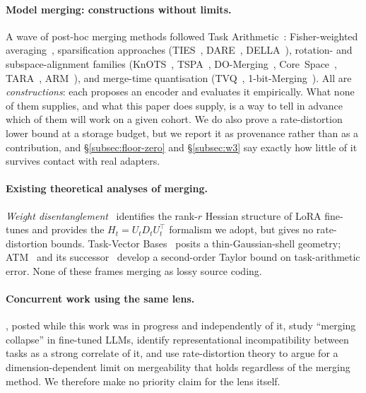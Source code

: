 \paragraph{Model merging: constructions without limits.}
A wave of post-hoc merging methods followed Task
Arithmetic~\citep{ilharco2023task}: Fisher-weighted
averaging~\citep{matena2022fisher}, sparsification approaches
(TIES~\citep{yadav2023ties}, DARE~\citep{yu2024dare},
DELLA~\citep{della2024}), rotation- and subspace-alignment families
(KnOTS~\citep{stoica2025knots}, TSPA~\citep{tspa2025},
DO-Merging~\citep{domerging2025}, Core~Space~\citep{panariello2025core},
TARA~\citep{tara2025}, ARM~\citep{arm2026streaming}), and merge-time
quantisation (TVQ~\citep{kim2025tvq},
1-bit-Merging~\citep{bit1merging2025}). All are \emph{constructions}:
each proposes an encoder and evaluates it empirically. What none of them
supplies, and what this paper does supply, is a way to tell in advance
which of them will work on a given cohort. We do also prove a
rate-distortion lower bound at a storage budget, but we report it as
provenance rather than as a contribution, and
\S\ref{subsec:floor-zero} and \S\ref{subsec:w3} say exactly how little
of it survives contact with real adapters.

\paragraph{Existing theoretical analyses of merging.}
\emph{Weight disentanglement}~\citep{ortizjimenez2023disentanglement}
identifies the rank-$r$ Hessian structure of LoRA fine-tunes and
provides the $H_t = U_t D_t U_t^\top$ formalism we adopt, but gives no
rate-distortion bounds. Task-Vector Bases~\citep{jang2025taskvectorbases}
posits a thin-Gaussian-shell geometry; ATM~\citep{atm2024alternating}
and its successor~\citep{gradients2025taskvectorsgradients} develop a
second-order Taylor bound on task-arithmetic error. None of these frames
merging as lossy source coding.

\paragraph{Concurrent work using the same lens.} \citet{cao2026collapse},
posted while this work was in progress and independently of it, study
``merging collapse'' in fine-tuned LLMs, identify representational
incompatibility between tasks as a strong correlate of it, and use
rate-distortion theory to argue for a dimension-dependent limit on
mergeability that holds regardless of the merging method. We therefore
make no priority claim for the lens itself.

